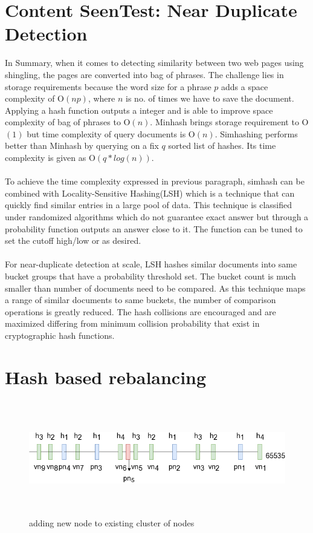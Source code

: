 \section{Content SeenTest: Near Duplicate Detection}\label{handle_dedupe}
\noindent
In Summary, when it comes to detecting similarity between two web pages using shingling, the pages are converted into bag of phrases. The challenge lies in storage requirements because the word size for a phrase $p$ adds a space complexity of O$(np)$, where $n$ is no. of times we have to save the document. Applying a hash function outputs a integer and is able to improve space complexity of bag of phrases to O$(n)$. Minhash\cite{dedupe} brings storage requirement to O$(1)$ but time complexity of query documents is O$(n)$. Simhashing\cite{dedupe} performs better than Minhash by querying on a fix $q$ sorted list of hashes. Its time complexity is given as O$(q * log(n))$.
\\
\\
To achieve the time complexity expressed in previous paragraph, simhash can be
combined with Locality-Sensitive Hashing(LSH)\cite{lsh} which is a technique that
can quickly find similar entries in a large pool of data. This technique is
classified under randomized algorithms which do not guarantee exact answer but
through a probability function outputs an answer close to it. The function can be
tuned to set the cutoff high/low or as desired.
\\
\\
\noindent
For near-duplicate detection at scale, LSH hashes similar documents into same bucket groups that have
a probability threshold set. The bucket count is much smaller than number of documents need to be
compared. As this technique maps a range of similar documents to same buckets, the number of
comparison operations is greatly reduced. The hash collisions are encouraged and are maximized differing
from minimum collision probability that exist in cryptographic hash functions.

\pagebreak

\section{Hash based rebalancing}
\begin{figure}[h!]
  \centering
  \includegraphics[width=12cm,height=5cm,keepaspectratio]{../media/crawler/addingnode.png}
  \caption{adding new node to existing cluster of nodes}
  \label{fig:addingnode}
\end{figure}

